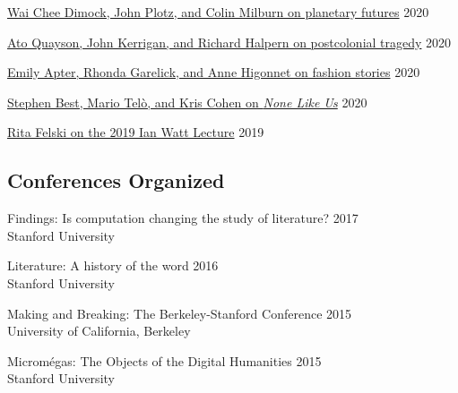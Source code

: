 \documentclass[
  12pt,
  letterpaper,
]{article}
\begin{document}
\href{https://web.archive.org/web/20220429010109/https://novel.stanford.edu/csn-cafe/2021/7/23/wai-chee-dimock-john-plotz-and-colin-milburn-on-the-literature-of-planetary-futures-52319}{Wai
Chee Dimock, John Plotz, and Colin Milburn on planetary futures}
\hfill 2020

\href{https://web.archive.org/web/20220429010041/https://novel.stanford.edu/csn-cafe/2021/7/23/ato-quayson-john-kerrigan-and-richard-halpern-on-postcolonial-tragedy-91519}{Ato
Quayson, John Kerrigan, and Richard Halpern on postcolonial tragedy}
\hfill 2020

\href{https://web.archive.org/web/20220429093237/https://novel.stanford.edu/csn-cafe/2021/7/23/fashion-stories-emily-apter-rhonda-garelick-and-anne-higonnet-on-the-cultural-history-of-clothing-1920}{Emily
Apter, Rhonda Garelick, and Anne Higonnet on fashion stories}
\hfill 2020

\href{https://web.archive.org/web/20220429093211/https://novel.stanford.edu/csn-cafe/2021/7/23/books-at-the-center-stephen-best-mario-tel-and-kris-cohen-on-none-like-us-101019}{Stephen
Best, Mario Telò, and Kris Cohen on \emph{None Like Us}} \hfill 2020

\href{https://web.archive.org/web/20220429093144/https://novel.stanford.edu/csn-cafe/2021/7/23/rita-felski-on-her-2019-ian-watt-lecture-5319}{Rita
Felski on the 2019 Ian Watt Lecture} \hfill 2019

\hypertarget{conferences-organized}{%
\subsection{Conferences Organized}\label{conferences-organized}}

Findings: Is computation changing the study of literature? \hfill 2017\\
\hspace*{0.333em} Stanford University

Literature: A history of the word \hfill 2016\\
\hspace*{0.333em} Stanford University

Making and Breaking: The Berkeley-Stanford Conference \hfill 2015\\
\hspace*{0.333em} University of California, Berkeley

Micromégas: The Objects of the Digital Humanities \hfill 2015\\
\hspace*{0.333em} Stanford University
\end{document}
